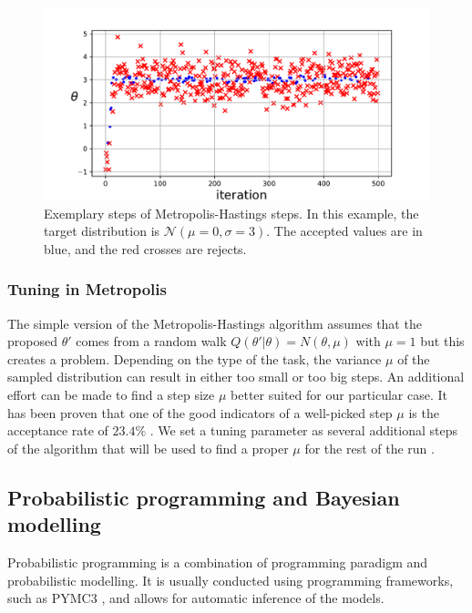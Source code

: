 \begin{figure}
  \centering
  \includegraphics[width=0.9\linewidth]{figures/chapter3/random_walk.pdf}
  \caption{ Exemplary steps of Metropolis-Hastings steps. In this example, the target distribution is $\mathcal{N}(\mu=0, \sigma=3)$. The accepted values are in blue, and the red crosses are rejects.}
  \label{fig:random_walk}
\end{figure}


\subsubsection{Tuning in Metropolis}
\label{chap3:tuning_metropolis}

The simple version of the Metropolis-Hastings algorithm assumes that the proposed $\theta\prime$ comes from a random walk $Q(\theta'|\theta)=N(\theta, \mu)$ with $\mu=1$ but this creates a problem.
Depending on the type of the task, the variance $\mu$ of the sampled distribution can result in either too small or too big steps.
An additional effort can be made to find a step size $\mu$ better suited for our particular case.
It has been proven that one of the good indicators of a well-picked step $\mu$ is the acceptance rate of $23.4\%$ \cite{10.1214/aoap/1034625254}.
We set a tuning parameter as several additional steps of the algorithm that will be used to find a proper $\mu$ for the rest of the run \cite{colin_carroll_2019}.

\subsection{Probabilistic programming and Bayesian modelling}

Probabilistic programming is a combination of programming paradigm and probabilistic modelling.
It is usually conducted using programming frameworks, such as PYMC3 \cite{Salvatier2016}, and allows for automatic inference of the models.

